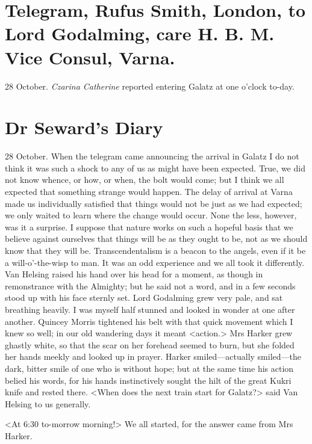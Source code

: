 \section{Telegram, Rufus Smith, London, to Lord Godalming, care H\@. B\@. M\@. Vice Consul, Varna.}

\begin{telegram}{28 October.}
\textit{Czarina Catherine} reported entering Galatz at one o'clock to-day.
\end{telegram}

\section{Dr Seward's Diary}

\begin{diary}{28 October.}
When the telegram came announcing the arrival in Galatz I do not think it was such a shock to any of us as might have been expected. True, we did not know whence, or how, or when, the bolt would come; but I think we all expected that something strange would happen. The delay of arrival at Varna made us individually satisfied that things would not be just as we had expected; we only waited to learn where the change would occur. None the less, however, was it a surprise. I suppose that nature works on such a hopeful basis that we believe against ourselves that things will be as they ought to be, not as we should know that they will be. Transcendentalism is a beacon to the angels, even if it be a will-o'-the-wisp to man. It was an odd experience and we all took it differently. Van Helsing raised his hand over his head for a moment, as though in remonstrance with the Almighty; but he said not a word, and in a few seconds stood up with his face sternly set. Lord Godalming grew very pale, and sat breathing heavily. I was myself half stunned and looked in wonder at one after another. Quincey Morris tightened his belt with that quick movement which I knew so well; in our old wandering days it meant <action.> Mrs Harker grew ghastly white, so that the scar on her forehead seemed to burn, but she folded her hands meekly and looked up in prayer. Harker smiled—actually smiled—the dark, bitter smile of one who is without hope; but at the same time his action belied his words, for his hands instinctively sought the hilt of the great Kukri knife and rested there. <When does the next train start for Galatz?> said Van Helsing to us generally.

<At 6:30 to-morrow morning!> We all started, for the answer came from Mrs Harker.


\end{diary}
